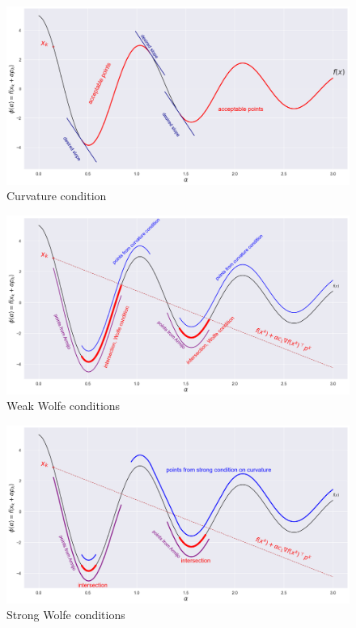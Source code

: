 \documentclass{article}
\begin{document}
\begin{figure}[H]
  \centering
  \includegraphics[width=\textwidth,keepaspectratio]{../data/curvature.png}
  \caption[Curvature condition]{Curvature condition}\label{fig:curvature}
\end{figure}

\begin{figure}[H]
  \centering
  \includegraphics[width=\textwidth,keepaspectratio]{../data/weak_wolfe.png}
  \caption[Weak Wolfe conditions]{Weak Wolfe conditions}\label{fig:weak_wolfe}
\end{figure}

\begin{figure}[H]
  \centering
  \includegraphics[width=\textwidth,keepaspectratio]{../data/strong_wolfe.png}
  \caption[Strong Wolfe conditions]{Strong Wolfe conditions}\label{fig:strong_wolfe}
\end{figure}
\end{document}

